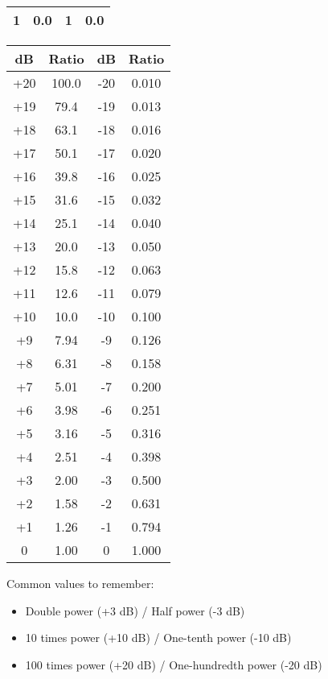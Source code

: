\begin{figure}[h]
\begin{minipage}{0.48\textwidth}
\begin{tabular}{|c|c||c|c|}
            1 & 0.0 & 1 & 0.0 \\
            \hline
        \end{tabular}
        \label{tab:power-db-ratios}
    \end{minipage}%
    \begin{minipage}{0.48\textwidth}
        \centering
        \scriptsize
        \begin{tabular}{|c|c||c|c|}
            \hline
            \textbf{dB} & \textbf{Ratio} & \textbf{dB} & \textbf{Ratio} \\
            \hline
            +20 & 100.0 & -20 & 0.010 \\
            +19 & 79.4 & -19 & 0.013 \\
            +18 & 63.1 & -18 & 0.016 \\
            +17 & 50.1 & -17 & 0.020 \\
            +16 & 39.8 & -16 & 0.025 \\
            +15 & 31.6 & -15 & 0.032 \\
            +14 & 25.1 & -14 & 0.040 \\
            +13 & 20.0 & -13 & 0.050 \\
            +12 & 15.8 & -12 & 0.063 \\
            +11 & 12.6 & -11 & 0.079 \\
            +10 & 10.0 & -10 & 0.100 \\
            +9 & 7.94 & -9 & 0.126 \\
            +8 & 6.31 & -8 & 0.158 \\
            +7 & 5.01 & -7 & 0.200 \\
            +6 & 3.98 & -6 & 0.251 \\
            +5 & 3.16 & -5 & 0.316 \\
            +4 & 2.51 & -4 & 0.398 \\
            +3 & 2.00 & -3 & 0.500 \\
            +2 & 1.58 & -2 & 0.631 \\
            +1 & 1.26 & -1 & 0.794 \\
            0 & 1.00 & 0 & 1.000 \\
            \hline
        \end{tabular}
        \label{tab:db-power-ratios}
    \end{minipage}
    \begin{tcolorbox}[colback=gray!10!white,colframe=black!75!black,title={Key Points}]
        Common values to remember:
        \begin{itemize}
            \item Double power (+3 dB) / Half power (-3 dB)
            \item 10 times power (+10 dB) / One-tenth power (-10 dB)
            \item 100 times power (+20 dB) / One-hundredth power (-20 dB)
        \end{itemize}
        \end{tcolorbox}
        \end{figure}

